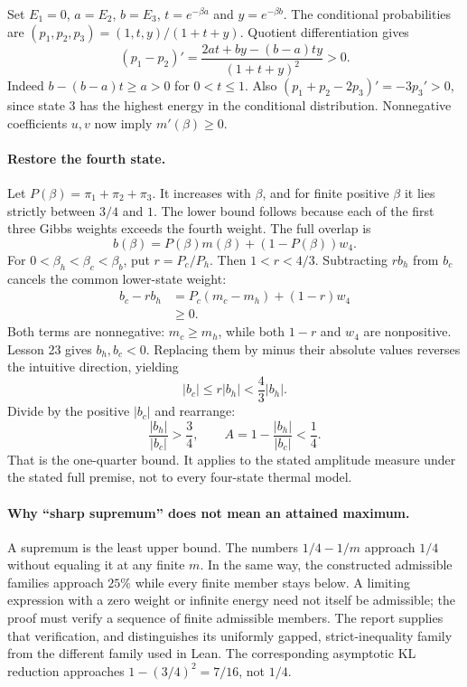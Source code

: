 \documentclass[11pt]{article}
\begin{document}
Set $E_1=0$, $a=E_2$, $b=E_3$, $t=e^{-\beta a}$ and $y=e^{-\beta b}$.
The conditional probabilities are $(p_1,p_2,p_3)=(1,t,y)/(1+t+y)$.
Quotient differentiation gives
\[
(p_1-p_2)'=\frac{2at+by-(b-a)ty}{(1+t+y)^2}>0.
\]
Indeed $b-(b-a)t\geq a>0$ for $0<t\leq1$. Also
$(p_1+p_2-2p_3)'=-3p_3'>0$, since state $3$ has the highest energy
in the conditional distribution. Nonnegative coefficients $u,v$ now imply
$m'(\beta)\geq0$.

\paragraph{Restore the fourth state.}
Let $P(\beta)=\pi_1+\pi_2+\pi_3$. It increases with $\beta$, and for
finite positive $\beta$ it lies strictly between $3/4$ and $1$.
The lower bound follows because each of the first three Gibbs weights
exceeds the fourth weight. The full overlap is
\[
b(\beta)=P(\beta)m(\beta)+(1-P(\beta))w_4.
\]
For $0<\beta_h<\beta_c<\beta_b$, put $r=P_c/P_h$. Then $1<r<4/3$.
Subtracting $rb_h$ from $b_c$ cancels the common lower-state weight:
\begin{align*}
b_c-rb_h
&=P_c(m_c-m_h)+(1-r)w_4\\
&\geq0.
\end{align*}
Both terms are nonnegative: $m_c\geq m_h$, while both $1-r$ and $w_4$
are nonpositive. Lesson 23 gives $b_h,b_c<0$. Replacing them by minus their
absolute values reverses the intuitive direction, yielding
\[
|b_c|\leq r|b_h|<\frac43|b_h|.
\]
Divide by the positive $|b_c|$ and rearrange:
\[
\frac{|b_h|}{|b_c|}>\frac34,
\qquad A=1-\frac{|b_h|}{|b_c|}<\frac14.
\]
That is the one-quarter bound. It applies to the stated amplitude measure
under the stated full premise, not to every four-state thermal model.

\paragraph{Why ``sharp supremum'' does not mean an attained maximum.}
A supremum is the least upper bound. The numbers $1/4-1/m$ approach $1/4$
without equaling it at any finite $m$. In the same way, the constructed
admissible families approach $25\%$ while every finite member stays below.
A limiting expression with a zero weight or infinite energy need not itself
be admissible; the proof must verify a sequence of finite admissible members.
The report supplies that verification, and distinguishes its uniformly
gapped, strict-inequality family from the different family used in Lean.
The corresponding asymptotic KL reduction approaches
$1-(3/4)^2=7/16$, not $1/4$.
\end{document}
